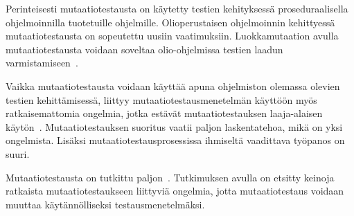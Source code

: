 \documentclass[finnish, grading]{tktltiki2}
\theoremstyle{definition}
\theoremstyle{remark}
\begin{document}
Perinteisesti mutaatiotestausta on käytetty testien kehityksessä proseduraalisella ohjelmoinnilla tuotetuille ohjelmille. Olioperustaisen ohjelmoinnin kehittyessä mutaatiotestausta on sopeutettu uusiin vaatimuksiin. Luokkamutaation avulla mutaatiotestausta voidaan soveltaa olio-ohjelmissa testien laadun varmistamiseen~\cite{Kim:Clark:McDermid:2000}.

Vaikka mutaatiotestausta voidaan käyttää apuna ohjelmiston olemassa olevien testien kehittämisessä, liittyy mutaatiotestausmenetelmän käyttöön myös ratkaisemattomia ongelmia, jotka estävät mutaatiotestauksen laaja-alaisen käytön~\cite[s. 652]{Jia:Harman:2011}. Mutaatiotestauksen suoritus vaatii paljon laskentatehoa, mikä on yksi ongelmista. Lisäksi mutaatiotestausprosessissa ihmiseltä vaadittava työpanos on suuri. 

Mutaatiotestausta on tutkittu paljon~\cite[s. 649]{Jia:Harman:2011}. Tutkimuksen avulla on etsitty keinoja ratkaista mutaatiotestaukseen liittyviä ongelmia, jotta mutaatiotestaus voidaan muuttaa käytännölliseksi testausmenetelmäksi. 

%
%
%
\end{document}
